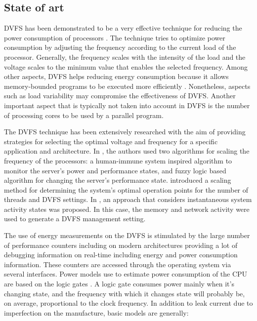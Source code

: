 \subsection{State of art}

DVFS has been demonstrated to be a very effective technique for reducing the power consumption of processors \cite{Hackenberg2015, Dzhagaryan2014, Hahnel2012, Basmadjian2012, Travers2015, Miyoshi2002, Anghel2011, Pietri2014}. The technique tries to optimize power consumption by adjusting the frequency according to the current load of the processor. Generally, the frequency scales with the intensity of the load and the voltage scales to the minimum value that enables the selected frequency. Among other aspects, DVFS helps reducing energy consumption because it allows memory-bounded programs to be executed more efficiently \cite{Spiga2006}. Nonetheless, aspects such as load variability may compromise the effectiveness of DVFS. Another important aspect that is typically not taken into account in DVFS is the number of processing cores to be used by a parallel program.

The DVFS technique has been extensively researched with the aim of providing strategies for selecting the optimal voltage and frequency for a specific application and architecture. In \cite{Anghel2011}, the authors used two algorithms for scaling the frequency of the processors: a human-immune system inspired algorithm to monitor the server's power and performance states, and fuzzy logic based algorithm for changing the server's performance state. \cite{Cochran2011} introduced a scaling method for determining the system's optimal operation points for the number of threads and DVFS settings. In \cite{DaCosta2015}, an approach that considers instantaneous system activity states was proposed. In this case, the memory and network activity were used to generate a DVFS management setting.


The use of energy measurements on the DVFS is stimulated by the large number of performance counters including on modern architectures providing a lot of debugging information on real-time including energy and power consumption information. These counters are accessed through the operating system via several interfaces.
Power models use to estimate power consumption of the CPU are based on the logic gates \cite{Du2017, Butzen2007}.  A logic gate consumes power mainly when it's changing state, and the frequency with which it changes state will probably be, on average, proportional to the clock frequency. In addition to leak current due to imperfection on the manufacture, basic models are generally:

